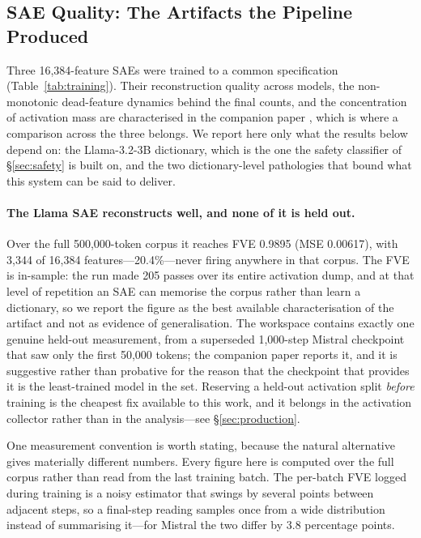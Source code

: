 \documentclass[11pt]{article}
\begin{document}
\subsection{SAE Quality: The Artifacts the Pipeline Produced}
\label{sec:quality}

Three 16,384-feature SAEs were trained to a common specification (Table~\ref{tab:training}). Their reconstruction quality across models, the non-monotonic dead-feature dynamics behind the final counts, and the concentration of activation mass are characterised in the companion paper \citep{melton2026saecomparison}, which is where a comparison across the three belongs. We report here only what the results below depend on: the Llama-3.2-3B dictionary, which is the one the safety classifier of \S\ref{sec:safety} is built on, and the two dictionary-level pathologies that bound what this system can be said to deliver.

\paragraph{The Llama SAE reconstructs well, and none of it is held out.} Over the full 500,000-token corpus it reaches FVE 0.9895 (MSE 0.00617), with 3,344 of 16,384 features---20.4\%---never firing anywhere in that corpus. The FVE is in-sample: the run made 205 passes over its entire activation dump, and at that level of repetition an SAE can memorise the corpus rather than learn a dictionary, so we report the figure as the best available characterisation of the artifact and not as evidence of generalisation. The workspace contains exactly one genuine held-out measurement, from a superseded 1,000-step Mistral checkpoint that saw only the first 50,000 tokens; the companion paper reports it, and it is suggestive rather than probative for the reason that the checkpoint that provides it is the least-trained model in the set. Reserving a held-out activation split \emph{before} training is the cheapest fix available to this work, and it belongs in the activation collector rather than in the analysis---see \S\ref{sec:production}.

One measurement convention is worth stating, because the natural alternative gives materially different numbers. Every figure here is computed over the full corpus rather than read from the last training batch. The per-batch FVE logged during training is a noisy estimator that swings by several points between adjacent steps, so a final-step reading samples once from a wide distribution instead of summarising it---for Mistral the two differ by 3.8 percentage points.
\end{document}
